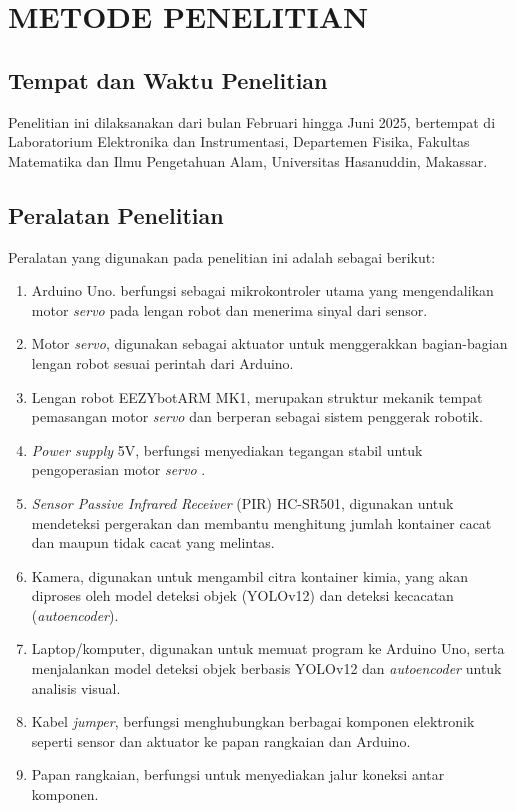 \chapter{METODE PENELITIAN}
\section{Tempat dan Waktu Penelitian}
\noindent
Penelitian ini dilaksanakan dari bulan Februari hingga Juni
2025, bertempat di Laboratorium Elektronika dan Instrumentasi,
Departemen Fisika, Fakultas Matematika dan Ilmu Pengetahuan Alam,
Universitas Hasanuddin, Makassar.

\vspace{1em}

\section{Peralatan Penelitian}
\noindent
Peralatan yang digunakan pada penelitian ini adalah sebagai berikut:
\begin{enumerate}
  \item Arduino Uno. berfungsi sebagai mikrokontroler utama yang
    mengendalikan motor \textit{servo} pada lengan robot dan menerima
    sinyal dari sensor.
  \item Motor \textit{servo}, digunakan sebagai aktuator untuk
    menggerakkan bagian-bagian lengan robot sesuai perintah dari Arduino.
  \item Lengan robot EEZYbotARM MK1, merupakan struktur
    mekanik  tempat pemasangan motor \textit{servo} dan berperan
    sebagai sistem penggerak robotik.
  \item \textit{Power supply} 5V, berfungsi menyediakan tegangan
    stabil untuk pengoperasian motor \textit{servo} .
  \item \textit{Sensor Passive Infrared Receiver} (PIR) HC-SR501,
    digunakan untuk mendeteksi pergerakan dan membantu
    menghitung jumlah kontainer cacat dan maupun tidak cacat yang melintas.
  \item Kamera, digunakan untuk mengambil citra kontainer kimia, yang
    akan diproses oleh model deteksi objek (YOLOv12) dan deteksi kecacatan
    (\textit{autoencoder}).
  \item Laptop/komputer, digunakan untuk memuat program ke Arduino
    Uno, serta menjalankan model deteksi objek berbasis YOLOv12 dan
    \textit{autoencoder} untuk analisis visual.
  \item Kabel \textit{jumper}, berfungsi menghubungkan berbagai komponen
    elektronik seperti sensor dan aktuator ke papan rangkaian dan
    Arduino.
  \item Papan rangkaian, berfungsi untuk menyediakan jalur koneksi
    antar komponen.
\end{enumerate}

